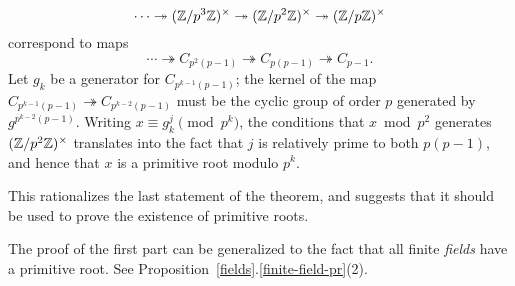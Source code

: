 \begin{rem}
\[
\cdots \twoheadrightarrow(\mathbb{Z}/p^3\mathbb{Z})^{\times}\twoheadrightarrow (\mathbb{Z}/p^2\mathbb{Z})^{\times}\twoheadrightarrow (\mathbb{Z}/p\mathbb{Z})^{\times}
\]
correspond to maps
\[
\cdots \twoheadrightarrow C_{p^2(p-1)}\twoheadrightarrow C_{p(p-1)}\twoheadrightarrow C_{p-1}.
\]
Let $g_k$ be a generator for $C_{p^{k-1}(p-1)}$; the kernel of the map $C_{p^{k-1}(p-1)}\twoheadrightarrow C_{p^{k-2}(p-1)}$ must be the cyclic group of order $p$ generated by $g^{p^{k-2}(p-1)}$. Writing $x\equiv g_k^j\pmod{p^k}$, the conditions that $x\bmod{p^2}$ generates $(\mathbb{Z}/p^2\mathbb{Z})^{\times}$ translates into the fact that $j$ is relatively prime to both $p(p-1)$, and hence that $x$ is a primitive root modulo $p^k$.

This rationalizes the last statement of the theorem, and suggests that it should be used to prove the existence of primitive roots.
\end{rem}
\begin{rem}
The proof of the first part can be generalized to the fact that all finite {\it fields} have a primitive root. See Proposition~\ref{fields}.\ref{finite-field-pr}(2).
\end{rem}
